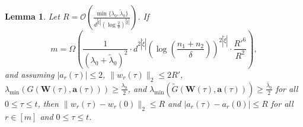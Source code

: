 \documentclass{article}
\newtheorem{lemma}{Lemma}
\begin{document}
\begin{lemma}\label{lem:8}
Let $R=\mathcal{O}\left(\frac{\min\{\lambda_0,\tilde\lambda_0\}}{d^{|\tilde{\xi}|}(\log\frac{2}{\delta})^{|\tilde{\xi}|}}\right)$. 
If
\begin{equation*}
    m = \Omega \left( \frac{1}{\left(\lambda_0 + \tilde{\lambda}_0\right)^2} \cdot 
   d^{2|\tilde{\xi}|} \left(\log\left(\frac{n_1+n_2}{\delta}\right)\right)^{2|\tilde{\xi}|} 
    \cdot \frac{R'^{6}}{R^2} \right) ,
\end{equation*}
and assuming \(|a_r(\tau)| \leq 2\), \(\|w_r(\tau)\|_2 \leq 2R'\), 
\(\lambda_{\min}(G(\mathbf{W}(\tau), \mathbf{a}(\tau))) \geq \frac{\lambda_0}{2}\), and 
\(\lambda_{\min}(\widetilde{G}(\mathbf{W}(\tau), \mathbf{a}(\tau))) \geq \frac{\bar{\lambda}_0}{2}\) for all \(0 \leq \tau \leq t\), then 
\(\|w_r(\tau) - w_r(0)\|_2 \leq R\) and \(|a_r(\tau) - a_r(0)| \leq R\) for all \(r \in [m]\) and \(0 \leq \tau \leq t\).
\end{lemma}
\end{document}
